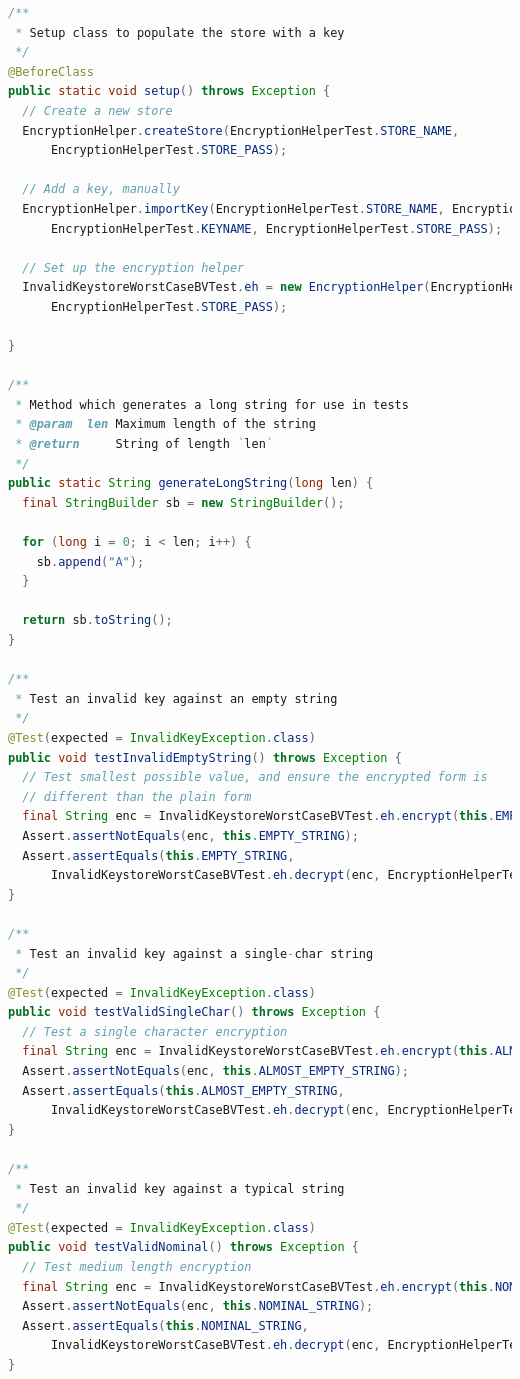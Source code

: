 \begin{lstlisting}[language=Java]
/**
 * Setup class to populate the store with a key
 */
@BeforeClass
public static void setup() throws Exception {
  // Create a new store
  EncryptionHelper.createStore(EncryptionHelperTest.STORE_NAME,
      EncryptionHelperTest.STORE_PASS);

  // Add a key, manually
  EncryptionHelper.importKey(EncryptionHelperTest.STORE_NAME, EncryptionHelperTest.KEY,
      EncryptionHelperTest.KEYNAME, EncryptionHelperTest.STORE_PASS);

  // Set up the encryption helper
  InvalidKeystoreWorstCaseBVTest.eh = new EncryptionHelper(EncryptionHelperTest.STORE_NAME,
      EncryptionHelperTest.STORE_PASS);

}

/**
 * Method which generates a long string for use in tests
 * @param  len Maximum length of the string
 * @return     String of length `len`
 */
public static String generateLongString(long len) {
  final StringBuilder sb = new StringBuilder();

  for (long i = 0; i < len; i++) {
    sb.append("A");
  }

  return sb.toString();
}

/**
 * Test an invalid key against an empty string
 */
@Test(expected = InvalidKeyException.class)
public void testInvalidEmptyString() throws Exception {
  // Test smallest possible value, and ensure the encrypted form is
  // different than the plain form
  final String enc = InvalidKeystoreWorstCaseBVTest.eh.encrypt(this.EMPTY_STRING, "Test");
  Assert.assertNotEquals(enc, this.EMPTY_STRING);
  Assert.assertEquals(this.EMPTY_STRING,
      InvalidKeystoreWorstCaseBVTest.eh.decrypt(enc, EncryptionHelperTest.KEYNAME));
}

/**
 * Test an invalid key against a single-char string
 */
@Test(expected = InvalidKeyException.class)
public void testValidSingleChar() throws Exception {
  // Test a single character encryption
  final String enc = InvalidKeystoreWorstCaseBVTest.eh.encrypt(this.ALMOST_EMPTY_STRING, "Test");
  Assert.assertNotEquals(enc, this.ALMOST_EMPTY_STRING);
  Assert.assertEquals(this.ALMOST_EMPTY_STRING,
      InvalidKeystoreWorstCaseBVTest.eh.decrypt(enc, EncryptionHelperTest.KEYNAME));
}

/**
 * Test an invalid key against a typical string
 */
@Test(expected = InvalidKeyException.class)
public void testValidNominal() throws Exception {
  // Test medium length encryption
  final String enc = InvalidKeystoreWorstCaseBVTest.eh.encrypt(this.NOMINAL_STRING, "Test");
  Assert.assertNotEquals(enc, this.NOMINAL_STRING);
  Assert.assertEquals(this.NOMINAL_STRING,
      InvalidKeystoreWorstCaseBVTest.eh.decrypt(enc, EncryptionHelperTest.KEYNAME));
}


\end{lstlisting}
